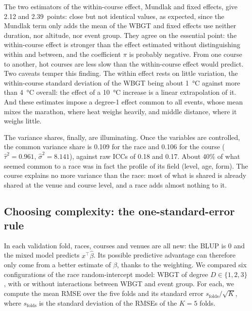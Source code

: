 \documentclass[11pt,a4paper]{article}
\begin{document}
The two estimators of the within-course effect, Mundlak and fixed effects, give 2.12 and 2.39~points: close but not
identical values, as expected, since the Mundlak term only adds the mean of the WBGT and fixed effects use neither
duration, nor altitude, nor event group. They agree on the essential point: the within-course effect is stronger than
the effect estimated without distinguishing within and between, and the coefficient $\pi$ is probably negative. From
one course to another, hot courses are less slow than the within-course effect would predict. Two caveats temper this
finding. The within effect rests on little variation, the within-course standard deviation of the WBGT being about
1~°C against more than 4~°C overall: the effect of a 10~°C increase is a linear extrapolation of it. And these
estimates impose a degree-1 effect common to all events, whose mean mixes the marathon, where heat weighs heavily, and
middle distance, where it weighs little.

The variance shares, finally, are illuminating. Once the variables are controlled, the common variance share is 0.109
for the race and 0.106 for the course ($\hat\tau^2 = 0.961$, $\hat\sigma^2 = 8.141$), against raw ICCs of 0.18 and
0.17. About 40\% of what seemed common to a race was in fact the profile of its field (level, age, form). The course
explains no more variance than the race: most of what is shared is already shared at the venue and course level, and
a race adds almost nothing to it.

\subsection{Choosing complexity: the one-standard-error rule}\label{sec:mixed_cv}

In each validation fold, races, courses and venues are all new: the BLUP is 0 and the mixed model predicts
$x^\top\hat\beta$. Its possible predictive advantage can therefore only come from a better estimate of $\beta$, thanks
to the weighting. We compared six configurations of the race random-intercept model: WBGT of degree
$D \in \{1, 2, 3\}$, with or without interactions between WBGT and event group. For each, we compute the mean RMSE over
the five folds and its standard error $s_{\text{folds}}/\sqrt{K}$, where $s_{\text{folds}}$ is the standard deviation of
the RMSEs of the $K = 5$ folds.
\end{document}
